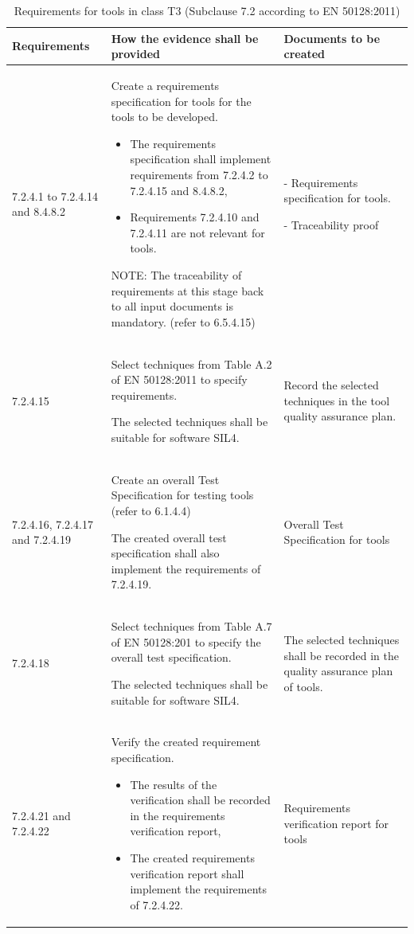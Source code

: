\documentclass{template/openetcs_report}
\begin{document}
{\footnotesize\sffamily\centering
\begin{longtable}{|p{2cm}|p{9cm}|p{3cm}|}
\caption{Requirements for tools in class T3 (Subclause 7.2 according to EN 50128:2011)}\\
\hline
\bfseries Requirements & \bfseries How the evidence shall be provided & \bfseries Documents to be created\\
\hline
\hline
\endhead
\hline
\endfoot

7.2.4.1 to 7.2.4.14 and 8.4.8.2 & Create a requirements specification for tools for the tools to be developed.
\begin{itemize}\itemsep=0pt
  \item The requirements specification shall implement requirements from 7.2.4.2 to 7.2.4.15 and 8.4.8.2,
  \item Requirements 7.2.4.10 and 7.2.4.11 are not relevant for tools. 
\end{itemize}
NOTE: \linebreak
The traceability of requirements at this stage back to all input documents is mandatory. (refer to 6.5.4.15)
& - Requirements specification for tools.

- Traceability proof\\ 
\hline
7.2.4.15 & Select techniques from Table A.2 of EN 50128:2011 to specify requirements. 

The selected techniques shall be suitable for software SIL4.
& Record the selected techniques in the tool quality assurance plan.\\ 
\hline
7.2.4.16, 7.2.4.17 and 7.2.4.19 & Create an overall Test Specification for testing tools (refer to 6.1.4.4)

The created overall test specification shall also implement the requirements of 7.2.4.19.
& Overall Test Specification for tools\\ 
\hline
7.2.4.18 & Select techniques from Table A.7 of EN 50128:201 to specify the overall test specification.

The selected techniques shall be suitable for software SIL4.
& The selected techniques shall be recorded in the quality assurance plan of tools.\\ 
\hline
7.2.4.21 and 7.2.4.22 & Verify the created requirement specification. 
\begin{itemize}\itemsep=0pt
  \item The results of the verification shall be recorded in the requirements verification report,
  \item The created requirements verification report shall implement the requirements of 7.2.4.22. 
\end{itemize}
& Requirements verification report for tools\\ 
\hline
\end{longtable}}
\end{document}
